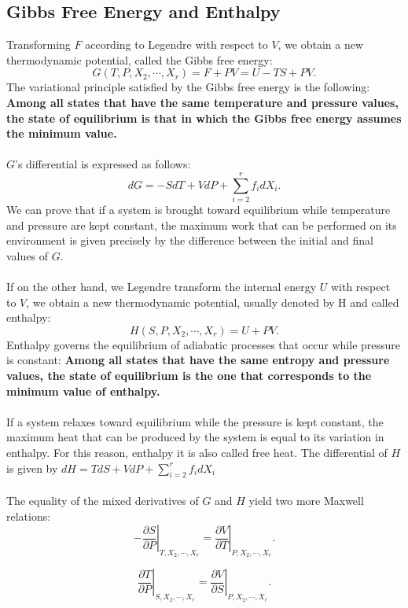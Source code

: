 \subsection{Gibbs Free Energy and Enthalpy}
Transforming $F$ according to Legendre with respect to $V$, we obtain a new thermodynamic potential, called the Gibbs free energy:
\[G(T,P,X_2,\cdots,X_r) = F + PV = U - TS + PV.\]
The variational principle satisfied by the Gibbs free
energy is the following:
\textbf{Among all states that have the same temperature and pressure values, the state of equilibrium is that in which the Gibbs free energy assumes the minimum value.}
\\ \\
$G$'s differential is expressed as follows:
\[dG = -SdT + VdP + \sum_{i=2}^r f_i dX_i .\]
We can prove that if a system is brought toward equilibrium while temperature and pressure are kept constant, the maximum work that can be performed on its environment is given precisely by the difference between the initial and final values of $G$.
\\ \\
If on the other hand, we Legendre transform the internal energy $U$ with respect to $V$, we obtain a new thermodynamic potential, usually denoted by H and called enthalpy:
\[H(S,P,X_2,\cdots,X_r) = U + PV.\]
Enthalpy governs the equilibrium of adiabatic processes that occur while pressure is constant:
\textbf{Among all states that have the same entropy and pressure values, the state of equilibrium is the one that corresponds to the minimum value of enthalpy.}
\\ \\
If a system relaxes toward equilibrium while the pressure is kept constant, the maximum heat that can be produced by the system is equal to its variation in enthalpy. For this reason, enthalpy it is also called free heat.
The differential of $H$ is given by
$dH = TdS + VdP + \sum_{i=2}^r f_i dX_i$
\\ \\
The equality of the mixed derivatives of $G$ and $H$ yield two more Maxwell relations:
\[\left. -\frac{\partial S}{\partial P} \right|_{T,X_2,\cdots,X_r} = \left. \frac{\partial V}{\partial T} \right|_{P,X_2,\cdots,X_r}.\]

\[\left. \frac{\partial T}{\partial P} \right|_{S,X_2,\cdots,X_r} = \left. \frac{\partial V}{\partial S} \right|_{P,X_2,\cdots,X_r}.\]

